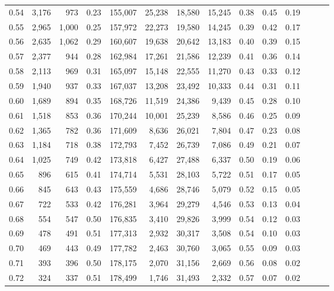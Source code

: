 \begin{tabular}{rrrrrrrrrrrrrr}
0.54 &  3,176 &    973 &  0.23 &  155,007 &   25,238 &  18,580 &  15,245 &  0.38 &  0.45 &      0.19 \\
0.55 &  2,965 &  1,000 &  0.25 &  157,972 &   22,273 &  19,580 &  14,245 &  0.39 &  0.42 &      0.17 \\
0.56 &  2,635 &  1,062 &  0.29 &  160,607 &   19,638 &  20,642 &  13,183 &  0.40 &  0.39 &      0.15 \\
0.57 &  2,377 &    944 &  0.28 &  162,984 &   17,261 &  21,586 &  12,239 &  0.41 &  0.36 &      0.14 \\
0.58 &  2,113 &    969 &  0.31 &  165,097 &   15,148 &  22,555 &  11,270 &  0.43 &  0.33 &      0.12 \\
0.59 &  1,940 &    937 &  0.33 &  167,037 &   13,208 &  23,492 &  10,333 &  0.44 &  0.31 &      0.11 \\
0.60 &  1,689 &    894 &  0.35 &  168,726 &   11,519 &  24,386 &   9,439 &  0.45 &  0.28 &      0.10 \\
0.61 &  1,518 &    853 &  0.36 &  170,244 &   10,001 &  25,239 &   8,586 &  0.46 &  0.25 &      0.09 \\
0.62 &  1,365 &    782 &  0.36 &  171,609 &    8,636 &  26,021 &   7,804 &  0.47 &  0.23 &      0.08 \\
0.63 &  1,184 &    718 &  0.38 &  172,793 &    7,452 &  26,739 &   7,086 &  0.49 &  0.21 &      0.07 \\
0.64 &  1,025 &    749 &  0.42 &  173,818 &    6,427 &  27,488 &   6,337 &  0.50 &  0.19 &      0.06 \\
0.65 &    896 &    615 &  0.41 &  174,714 &    5,531 &  28,103 &   5,722 &  0.51 &  0.17 &      0.05 \\
0.66 &    845 &    643 &  0.43 &  175,559 &    4,686 &  28,746 &   5,079 &  0.52 &  0.15 &      0.05 \\
0.67 &    722 &    533 &  0.42 &  176,281 &    3,964 &  29,279 &   4,546 &  0.53 &  0.13 &      0.04 \\
0.68 &    554 &    547 &  0.50 &  176,835 &    3,410 &  29,826 &   3,999 &  0.54 &  0.12 &      0.03 \\
0.69 &    478 &    491 &  0.51 &  177,313 &    2,932 &  30,317 &   3,508 &  0.54 &  0.10 &      0.03 \\
0.70 &    469 &    443 &  0.49 &  177,782 &    2,463 &  30,760 &   3,065 &  0.55 &  0.09 &      0.03 \\
0.71 &    393 &    396 &  0.50 &  178,175 &    2,070 &  31,156 &   2,669 &  0.56 &  0.08 &      0.02 \\
0.72 &    324 &    337 &  0.51 &  178,499 &    1,746 &  31,493 &   2,332 &  0.57 &  0.07 &      0.02 \\

\end{tabular}
